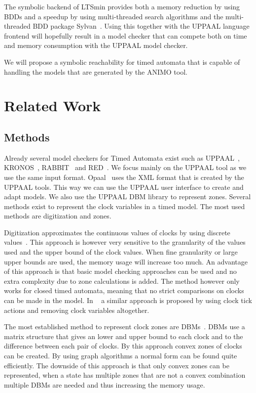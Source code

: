 \documentclass[11pt]{article}
\begin{document}
The symbolic backend of LTSmin provides both a memory reduction by using BDDs and a speedup by using multi-threaded search algorithms and the multi-threaded BDD package Sylvan~\cite{sylvan}. Using this together with the UPPAAL language frontend will hopefully result in a model checker that can compete both on time and memory consumption with the UPPAAL model checker.

We will propose a symbolic reachability for timed automata that is capable of handling the models that are generated by the ANIMO tool.

\section{Related Work}
\subsection{Methods}
Already several model checkers for Timed Automata exist such as UPPAAL~\cite{UPPAAL}, KRONOS~\cite{kronos}, RABBIT~\cite{CAV03} and RED~\cite{crds}. We focus mainly on the UPPAAL tool as we use the same input format. Opaal~\cite{opaal} uses the XML format that is created by the UPPAAL tools. This way we can use the UPPAAL user interface to create and adapt models. We also use the UPPAAL DBM library to represent zones. Several methods exist to represent the clock variables in a timed model. The most used methods are digitization and zones. 

Digitization approximates the continuous values of clocks by using discrete values~\cite{CHARME01}. This approach is however very sensitive to the granularity of the values used and the upper bound of the clock values. When fine granularity or large upper bounds are used, the memory usage will increase too much. An advantage of this approach is that basic model checking approaches can be used and no extra complexity due to zone calculations is added. The method however only works for closed timed automata, meaning that no strict comparisons on clocks can be made in the model. In ~\cite{nguyen2012discrete} a similar approach is proposed by using clock tick actions and removing clock variables altogether. 

The most established method to represent clock zones are DBMs~\cite{dbmorig, bengtsson2002clocks}. DBMs use a matrix structure that gives an lower and upper bound to each clock and to the difference between each pair of clocks. By this approach convex zones of clocks can be created. By using graph algorithms a normal form can be found quite efficiently. The downside of this approach is that only convex zones can be represented, when a state has multiple zones that are not a convex combination multiple DBMs are needed and thus increasing the memory usage. 
\end{document}
